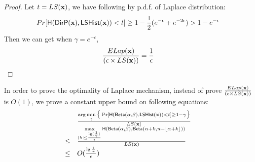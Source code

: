 \documentclass{article}
\begin{document}
%
\begin{proof}
%
Let $t = LS(\textbf{x})$, we have following by p.d.f. of Laplace distribution:
 \[
Pr[\mathsf{H}(\mathsf{DirP}(\textbf{x}), \mathsf{LSHist}(\textbf{x}))< t] 
\geq 1 - \frac{1}{2}(e^{-\epsilon} + e^{-2\epsilon})
> 1 - e^{-\epsilon}
\]
Then we can get when $\gamma = e^{-\epsilon}$, 
\[
\frac{ELap(\textbf{x})}{(\epsilon \times LS(\textbf{x}))} = \frac{1}{\epsilon}
\]
%
\end{proof}
%
%
%
{\color{red}
\begin{thm}
In order to prove the optimality of Laplace mechanism, instead of prove
$\frac{ELap(\textbf{x})}{(\epsilon \times LS(\textbf{x}))}$ is $O(1)$, we prove a constant upper bound on following equations:
\[
\begin{array}{ll}
	 &	\frac{\arg\min\limits_{t}\big\{\Pr[\mathsf{H}(\mathsf{Beta}(\alpha, \beta), \mathsf{LSHist}(\textbf{x}))< t] \geq 1 - \gamma \big\}}
	 	{	LS(\textbf{x})	}\\
\leq &	\frac{\max\limits_{|k| \leq \frac{\lg(\frac{1}{\gamma})}{\epsilon}}
		\mathsf{H}(\mathsf{Beta}(\alpha, \beta), \mathsf{Beta}(\alpha + k, n - \lfloor \alpha + k \rfloor))}
		{	LS(\textbf{x})	}\\
\leq & 	O(\frac{\lg{\frac{1}{\gamma}}}{\epsilon})
\end{array}
\]
\end{thm}
}
\end{document}
